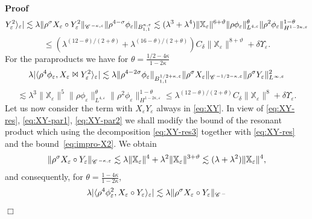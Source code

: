 \documentclass[a4paper,11pt]{article}
\newenvironment{proof}{\noindent\textbf{Proof\ }}{\hspace*{\fill}$\Box$\medskip}
\numberwithin{equation}{section}
\begin{document}
\begin{proof}
\[     Y_{\varepsilon}^2 \rangle_{\varepsilon} | \lesssim \lambda \|
     \rho^{\sigma} X_{\varepsilon} \circ Y_{\varepsilon}^2 \|_{\mathscr{C}
     \hspace{.1em}^{- \kappa, \varepsilon}} \| \rho^{4 - \sigma}
     \phi_{\varepsilon} \|_{B^{\kappa, \varepsilon}_{1, 1}} \lesssim
     (\lambda^3 + \lambda^4) \| \mathbb{X}_{\varepsilon} \|^{6 + \vartheta} \|
     \rho \phi_{\varepsilon} \|^{\theta}_{L^{4, \varepsilon}} \| \rho^2
     \phi_{\varepsilon} \|_{H^{1 - 2 \kappa, \varepsilon}}^{1 - \theta} \]
  \[ \leqslant (\lambda^{(12 - \theta) / (2 + \theta)} + \lambda^{(16 -
     \theta) / (2 + \theta)}) C_{\delta} \| \mathbb{X}_{\varepsilon} \|^{8 +
     \vartheta} + \delta \Upsilon_{\varepsilon} . \]
  For the paraproducts we have for $\theta = \frac{1 / 2 - 4 \kappa}{1 - 2
  \kappa}$
  \[ \lambda | \langle \rho^4 \phi_{\varepsilon}, X_{\varepsilon} \Join
     Y_{\varepsilon}^2 \rangle_{\varepsilon} | \lesssim \lambda \| \rho^{4 - 2
     \sigma} \phi_{\varepsilon} \|_{B^{1 / 2 + \kappa,\varepsilon}_{1, 1}} \|
     \rho^{\sigma} X_{\varepsilon} \|_{\mathscr{C} \hspace{.1em}^{- 1 / 2 -
     \kappa, \varepsilon}} \| \rho^{\sigma} Y_{\varepsilon} \|_{L^{\infty,
     \varepsilon}}^2 \]
  \[ \lesssim \lambda^3 \| \mathbb{X}_{\varepsilon} \|^5 \| \rho
     \phi_{\varepsilon} \|^{\theta}_{L^{4, \varepsilon}} \| \rho^2
     \phi_{\varepsilon} \|^{1 - \theta}_{H^{1 - 2 \kappa,\varepsilon}} \leqslant
     \lambda^{(12 - \theta) / (2 + \theta)} C_{\delta} \|
     \mathbb{X}_{\varepsilon} \|^8 + \delta \Upsilon_{\varepsilon} . \]
  Let us now consider the term with $X_{\varepsilon} Y_{\varepsilon}$ always
  in {\eqref{eq:XY}}. In view of {\eqref{eq:XY-res}}, {\eqref{eq:XY-par1}},
  {\eqref{eq:XY-par2}} we shall modify the bound of the resonant
  product which using the decomposition {\eqref{eq:XY-res3}} together with
  {\eqref{eq:XY-res}} and the bound~{\eqref{eq:impro-X2}}. We obtain
  \[ \| \rho^{\sigma} X_{\varepsilon} \circ Y_{\varepsilon} \|_{\mathscr{C}
     \hspace{.1em}^{- \kappa, \varepsilon}} \lesssim \lambda \|
     \mathbb{X}_{\varepsilon} \|^4 + \lambda^2 \| \mathbb{X}_{\varepsilon}
     \|^{3 + \vartheta} \lesssim (\lambda + \lambda^2) \|
     \mathbb{X}_{\varepsilon} \|^4 , \]
  and consequently, for $\theta = \frac{1 - 4 \kappa}{1 - 2 \kappa}$,
  \[ \lambda | \langle \rho^4 \phi_{\varepsilon}^2, X_{\varepsilon} \circ
     Y_{\varepsilon} \rangle_{\varepsilon} | \lesssim \lambda \| \rho^{\sigma}
     X_{\varepsilon} \circ Y_{\varepsilon} \|_{\mathscr{C} \hspace{.1em}^{-
}}\]
\end{proof}
\end{document}
